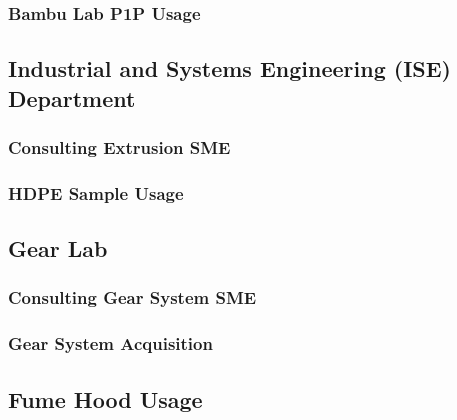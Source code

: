 \subsubsection{Bambu Lab P1P Usage\label{sec:methedology:externalLabs:eed:bambuUsage}}

\subsection{Industrial and Systems Engineering (ISE) Department\label{sec:methedology:externalLabs:ise}}

\subsubsection{Consulting Extrusion SME\label{sec:methedology:externalLabs:ise:consultingExtrusionSME}}

\subsubsection{HDPE Sample Usage\label{sec:methedology:externalLabs:ise:hdpeSampleUsage}}

\subsection{Gear Lab\label{sec:methedology:externalLabs:gearLab}}

\subsubsection{Consulting Gear System SME\label{sec:methedology:externalLabs:gearLab:consultingGearSystemSME}}

\subsubsection{Gear System Acquisition\label{sec:methedology:externalLabs:gearLab:gearSystemAcquisition}}

\subsection{Fume Hood Usage\label{sec:methedology:externalLabs:fumeHoodUsage}}


